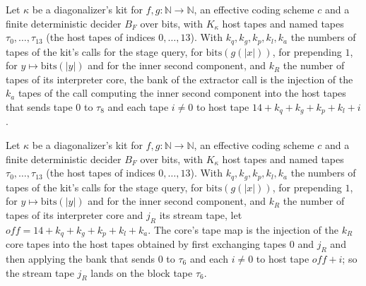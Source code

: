 \begin{definition}
\label{Turing.NTimeDiag.DzKit.bA}
\leanok
{}
Let $\kappa$ be a diagonalizer's kit for $f, g : \mathbb{N} \to \mathbb{N}$, an effective coding scheme $c$ and a finite deterministic decider $B_F$ over bits, with $K_\kappa$ host tapes and named tapes $\tau_0, \dots, \tau_{13}$ (the host tapes of indices $0, \dots, 13$). With $k_q, k_g, k_p, k_l, k_a$ the numbers of tapes of the kit's calls for the stage query, for $\mathrm{bits}(g(|x|))$, for prepending $1$, for $y \mapsto \mathrm{bits}(|y|)$ and for the inner second component, and $k_R$ the number of tapes of its interpreter core, the bank of the extractor call is the injection of the $k_a$ tapes of the call computing the inner second component into the host tapes that sends tape $0$ to $\tau_8$ and each tape $i \ne 0$ to host tape $14 + k_q + k_g + k_p + k_l + i$.
\end{definition}

\begin{definition}
\label{Turing.NTimeDiag.DzKit.bR}
\leanok
{}
Let $\kappa$ be a diagonalizer's kit for $f, g : \mathbb{N} \to \mathbb{N}$, an effective coding scheme $c$ and a finite deterministic decider $B_F$ over bits, with $K_\kappa$ host tapes and named tapes $\tau_0, \dots, \tau_{13}$ (the host tapes of indices $0, \dots, 13$). With $k_q, k_g, k_p, k_l, k_a$ the numbers of tapes of the kit's calls for the stage query, for $\mathrm{bits}(g(|x|))$, for prepending $1$, for $y \mapsto \mathrm{bits}(|y|)$ and for the inner second component, and $k_R$ the number of tapes of its interpreter core and $j_R$ its stream tape, let $\mathit{off} = 14 + k_q + k_g + k_p + k_l + k_a$. The core's tape map is the injection of the $k_R$ core tapes into the host tapes obtained by first exchanging tapes $0$ and $j_R$ and then applying the bank that sends $0$ to $\tau_6$ and each $i \ne 0$ to host tape $\mathit{off} + i$; so the stream tape $j_R$ lands on the block tape $\tau_6$.
\end{definition}

